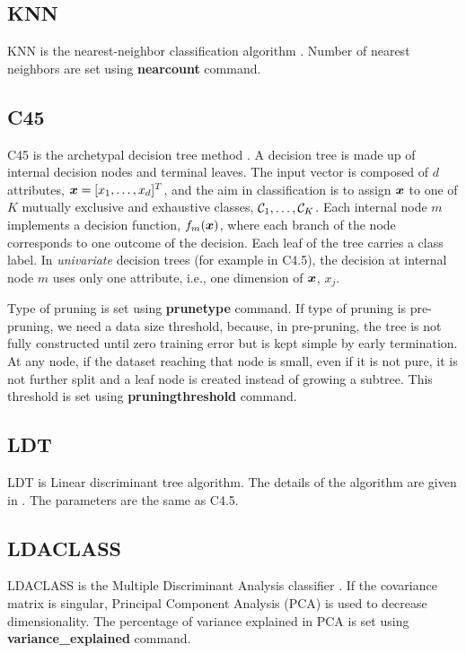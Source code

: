 \documentclass[a4paper,12pt]{book}
\def\bx{{\mbox{\boldmath $x$}}}
\def\cC{{\cal C}}
\def\bx{{\mbox{\boldmath $x$}}}
\begin{document}
\subsection{KNN}
KNN is the nearest-neighbor classification algorithm \cite{duda73}. Number of nearest neighbors are set using {\bf nearcount} command.

\subsection{C45}
C45 is the archetypal decision tree method \cite{quinlan93}. A decision tree is made up of internal decision nodes and terminal leaves. The input vector is composed of $d$ attributes, $\bx=[x_1, \ldots, x_d]^T$, and the aim in classification is to assign $\bx$ to one of $K$ mutually exclusive and exhaustive classes, $\cC_1, \ldots, \cC_K$. Each internal node $m$ implements a decision function, $f_m(\bx)$, where each branch of the node corresponds to one outcome of the decision. Each leaf of the tree carries a class label. In {\em univariate} decision trees (for example in C4.5), the decision at internal node $m$ uses only one attribute, i.e., one dimension of $\bx$, $x_j$. 

Type of pruning is set using {\bf prunetype} command. If type of pruning is pre-pruning, we need a data size threshold, because, in pre-pruning, the tree is not fully constructed until zero training error but is kept simple by early termination. At any node, if the dataset reaching that node is small, even if it is not pure, it is not further split and a leaf node is created instead of growing a subtree. This threshold is set using {\bf pruningthreshold} command.

\subsection{LDT}
LDT is Linear discriminant tree algorithm. The details of the algorithm are given in \cite{yildiz04}. The parameters are the same as C4.5.

\subsection{LDACLASS}
LDACLASS is the Multiple Discriminant Analysis classifier \cite{duda73}. If the covariance matrix is singular, Principal Component Analysis (PCA) is used to decrease dimensionality. The percentage of variance explained in PCA is set using {\bf variance\_explained} command.
\end{document}
